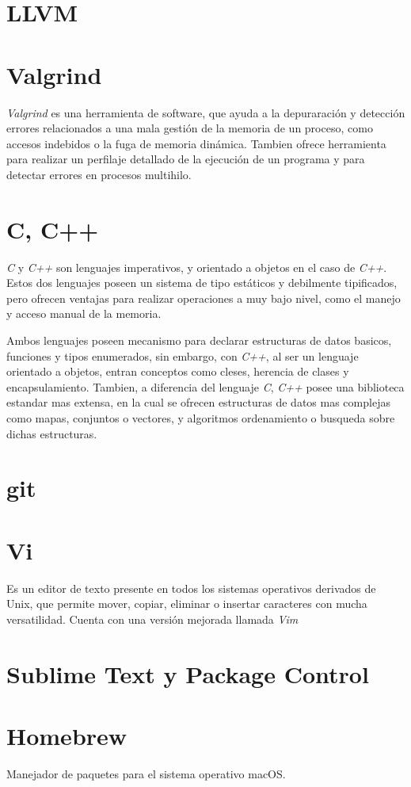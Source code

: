 \section{LLVM}




\section{Valgrind}
\textit{Valgrind} es una herramienta de software, que ayuda a la depuraración y
detección errores relacionados a una mala gestión de la memoria de un
proceso, como accesos indebidos o la fuga de memoria dinámica. Tambien ofrece
herramienta para realizar un perfilaje detallado de la ejecución de un
programa y para detectar errores en procesos multihilo.

\section{C, C++}
\textit{C} y \textit{C++} son lenguajes imperativos, y orientado a objetos en
el caso de \textit{C++}. Estos dos lenguajes poseen un sistema de tipo
estáticos y debilmente tipificados, pero ofrecen ventajas para realizar
operaciones a muy bajo nivel, como el manejo y acceso manual de la memoria.

Ambos lenguajes poseen mecanismo para declarar estructuras de datos basicos,
funciones y tipos enumerados, sin embargo, con \textit{C++}, al ser un
lenguaje orientado a objetos, entran conceptos como cleses, herencia de clases
y encapsulamiento. Tambien, a diferencia del lenguaje \textit{C}, \textit{C++}
posee una biblioteca estandar mas extensa, en la cual se ofrecen estructuras
de datos mas complejas como mapas, conjuntos o vectores, y algoritmos
ordenamiento o busqueda sobre dichas estructuras.

\section{git}


\section{Vi}
Es un editor de texto presente en todos los sistemas operativos derivados de Unix,
que  permite mover, copiar, eliminar o insertar caracteres con mucha
versatilidad. Cuenta con una versión mejorada llamada \textit{Vim}

\section{Sublime Text y Package Control}

\section{Homebrew}
Manejador de paquetes para el sistema operativo macOS.
